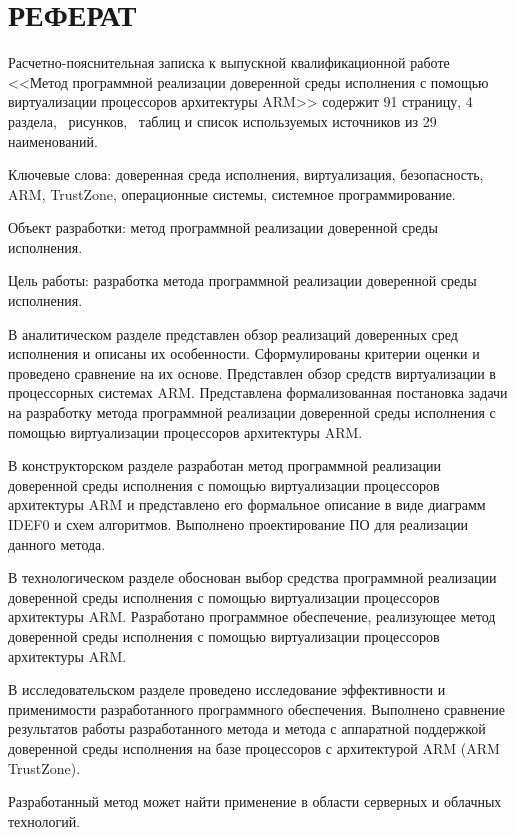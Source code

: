 \section*{РЕФЕРАТ}

Расчетно-пояснительная записка к выпускной квалификационной работе <<Метод программной реализации доверенной среды исполнения с помощью виртуализации процессоров архитектуры ARM>> содержит 91 страницу, 4 раздела, \totalfigures\ рисунков, \totaltables\ таблиц и список используемых источников из 29 наименований.

Ключевые слова: доверенная среда исполнения, виртуализация, безопасность, ARM, TrustZone, операционные системы, системное программирование.

Объект разработки: метод программной реализации доверенной среды исполнения.

Цель работы: разработка метода программной реализации доверенной среды исполнения.
 
В аналитическом разделе представлен обзор реализаций доверенных сред исполнения и описаны их особенности. Сформулированы критерии оценки и проведено сравнение на их основе. Представлен обзор средств виртуализации в процессорных системах ARM. Представлена формализованная постановка задачи на разработку метода программной реализации доверенной среды исполнения с помощью виртуализации процессоров архитектуры ARM.

В конструкторском разделе разработан метод программной реализации доверенной среды исполнения с помощью виртуализации процессоров архитектуры ARM и представлено его формальное описание в виде диаграмм IDEF0 и схем алгоритмов. Выполнено проектирование ПО для реализации данного метода.

В технологическом разделе обоснован выбор средства программной реализации доверенной среды исполнения с помощью виртуализации процессоров архитектуры ARM. Разработано программное обеспечение, реализующее метод доверенной среды исполнения с помощью виртуализации процессоров архитектуры ARM.

В исследовательском разделе проведено исследование эффективности и применимости разработанного программного обеспечения. Выполнено сравнение результатов работы разработанного метода и метода с аппаратной поддержкой доверенной среды исполнения на базе процессоров с архитектурой ARM (ARM TrustZone).

Разработанный метод может найти применение в области серверных и облачных технологий.

\pagebreak
